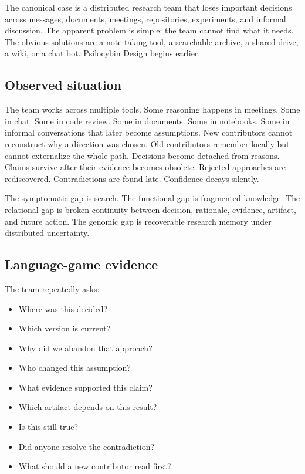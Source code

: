 \documentclass[11pt]{article}
\begin{document}
The canonical case is a distributed research team that loses important decisions across messages, documents, meetings, repositories, experiments, and informal discussion. The apparent problem is simple: the team cannot find what it needs. The obvious solutions are a note-taking tool, a searchable archive, a shared drive, a wiki, or a chat bot. Psilocybin Design begins earlier.

\subsection{Observed situation}

The team works across multiple tools. Some reasoning happens in meetings. Some in chat. Some in code review. Some in documents. Some in notebooks. Some in informal conversations that later become assumptions. New contributors cannot reconstruct why a direction was chosen. Old contributors remember locally but cannot externalize the whole path. Decisions become detached from reasons. Claims survive after their evidence becomes obsolete. Rejected approaches are rediscovered. Contradictions are found late. Confidence decays silently.

The symptomatic gap is search. The functional gap is fragmented knowledge. The relational gap is broken continuity between decision, rationale, evidence, artifact, and future action. The genomic gap is recoverable research memory under distributed uncertainty.

\subsection{Language-game evidence}

The team repeatedly asks:

\begin{itemize}[leftmargin=*]
    \item Where was this decided?
    \item Which version is current?
    \item Why did we abandon that approach?
    \item Who changed this assumption?
    \item What evidence supported this claim?
    \item Which artifact depends on this result?
    \item Is this still true?
    \item Did anyone resolve the contradiction?
    \item What should a new contributor read first?
\end{itemize}
\end{document}
